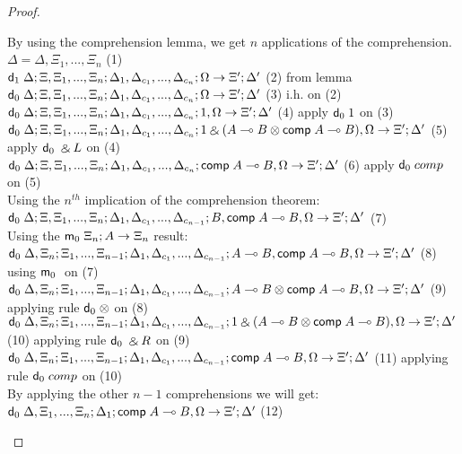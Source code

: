 \begin{proof}
\begin{itemize}
      By using the comprehension lemma, we get $n$ applications of the comprehension.\\
      $\Delta = \Delta, \Xi_1, ..., \Xi_n$ \hfill (1)\\
      $\mathsf{d}_1 \; \Delta; \Xi, \Xi_1, ..., \Xi_n; \Delta_1, \Delta_{c_1}, ..., \Delta_{c_n}; \Omega \rightarrow \Xi'; \Delta'$ \hfill (2) from lemma \\
      $\mathsf{d}_0 \; \Delta; \Xi, \Xi_1, ..., \Xi_n; \Delta_1, \Delta_{c_1}, ..., \Delta_{c_n}; \Omega \rightarrow \Xi'; \Delta'$ \hfill (3) i.h. on (2) \\
      $\mathsf{d}_0 \; \Delta; \Xi, \Xi_1, ..., \Xi_n; \Delta_1, \Delta_{c_1}, ..., \Delta_{c_n}; 1, \Omega \rightarrow \Xi'; \Delta'$ \hfill (4) apply $\mathsf{d}_0 \; 1$ on (3) \\
      $\mathsf{d}_0 \; \Delta; \Xi, \Xi_1, ..., \Xi_n; \Delta_1, \Delta_{c_1}, ..., \Delta_{c_n}; 1 \mathbin{\binampersand} (A \multimap B \otimes \mathsf{comp} \; A \multimap B), \Omega \rightarrow \Xi'; \Delta'$ \hfill (5) apply $\mathsf{d}_0 \; \mathbin{\binampersand} L$ on (4) \\
      $\mathsf{d}_0 \; \Delta; \Xi, \Xi_1, ..., \Xi_n; \Delta_1, \Delta_{c_1}, ..., \Delta_{c_n}; \mathsf{comp} \; A \multimap B, \Omega \rightarrow \Xi'; \Delta'$ \hfill (6) apply $\mathsf{d}_0 \; comp$ on (5) \\
      Using the $n^{th}$ implication of the comprehension theorem:\\
      $\mathsf{d}_0 \; \Delta; \Xi, \Xi_1, ..., \Xi_n; \Delta_1, \Delta_{c_1}, ..., \Delta_{c_{n-1}}; B, \mathsf{comp} \; A \multimap B, \Omega \rightarrow \Xi'; \Delta'$ \hfill (7) \\
      Using the $\mathsf{m}_0 \; \Xi_n; A \rightarrow \Xi_n$ result: \\
      $\mathsf{d}_0 \; \Delta, \Xi_n; \Xi_1, ..., \Xi_{n-1}; \Delta_1, \Delta_{c_1}, ..., \Delta_{c_{n-1}}; A \multimap B, \mathsf{comp} \; A \multimap B, \Omega \rightarrow \Xi'; \Delta'$ \hfill (8) using $\mathsf{m}_0 \;$ on (7) \\
      $\mathsf{d}_0 \; \Delta, \Xi_n; \Xi_1, ..., \Xi_{n-1}; \Delta_1, \Delta_{c_1}, ..., \Delta_{c_{n-1}}; A \multimap B \otimes \mathsf{comp} \; A \multimap B, \Omega \rightarrow \Xi'; \Delta'$ \hfill (9) applying rule $\mathsf{d}_0 \; \otimes$ on (8) \\
      $\mathsf{d}_0 \; \Delta, \Xi_n; \Xi_1, ..., \Xi_{n-1}; \Delta_1, \Delta_{c_1}, ..., \Delta_{c_{n-1}}; 1 \mathbin{\binampersand} (A \multimap B \otimes \mathsf{comp} \; A \multimap B), \Omega \rightarrow \Xi'; \Delta'$ \hfill (10) applying rule $\mathsf{d}_0 \; \mathbin{\binampersand} R$ on (9) \\
      $\mathsf{d}_0 \; \Delta, \Xi_n; \Xi_1, ..., \Xi_{n-1}; \Delta_1, \Delta_{c_1}, ..., \Delta_{c_{n-1}}; \mathsf{comp} \; A \multimap B, \Omega \rightarrow \Xi'; \Delta'$ \hfill (11) applying rule $\mathsf{d}_0 \; comp$ on (10) \\
      By applying the other $n-1$ comprehensions we will get: \\
      $\mathsf{d}_0 \; \Delta, \Xi_1, ..., \Xi_n; \Delta_1; \mathsf{comp} \; A \multimap B, \Omega \rightarrow \Xi'; \Delta'$ \hfill (12)
   \end{itemize}
\end{proof}